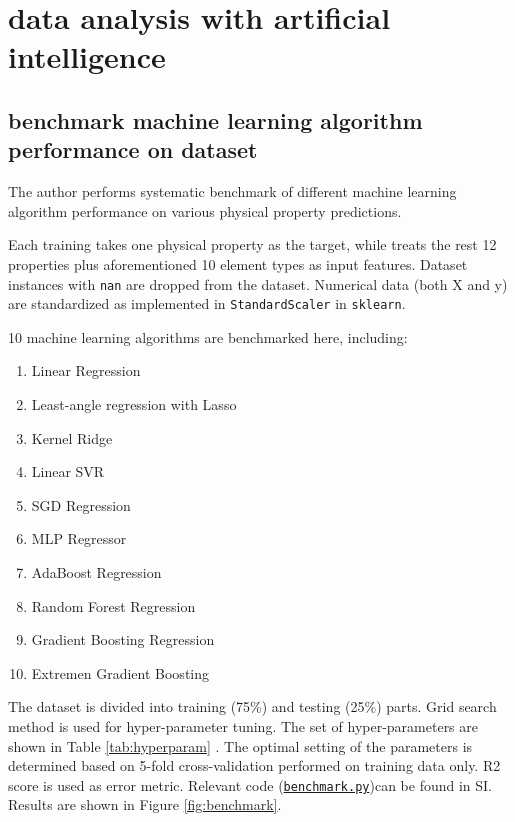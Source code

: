 \documentclass[10pt,aps,prb,amsmath,amssymb,twocolumn,letterpaper,nobalancelastpage,final,citeautoscript,floatfix,raggedbottom,superscriptaddress]{revtex4-1}
\begin{document}
\section{data analysis with artificial intelligence}

\subsection{benchmark machine learning algorithm performance on dataset}

The author performs systematic benchmark of different machine learning algorithm performance on various physical property predictions.

Each training takes one physical property as the target, while treats the rest 12 properties plus aforementioned 10 element types as input features. Dataset instances with \texttt{nan} are dropped from the dataset. Numerical data (both X and y) are standardized as implemented in \texttt{StandardScaler} in \texttt{sklearn}.



10 machine learning algorithms are benchmarked here, including:
\begin{enumerate}
	\item Linear Regression	
	\item Least-angle regression with Lasso
	\item Kernel Ridge
	\item Linear SVR
	\item SGD Regression
	\item MLP Regressor
	\item AdaBoost Regression
	\item Random Forest Regression
	\item Gradient Boosting Regression
	\item Extremen Gradient Boosting
\end{enumerate}


The dataset is divided into training (75\%) and testing (25\%) parts. Grid search method is used for hyper-parameter tuning. The set of hyper-parameters are shown in Table \ref{tab:hyperparam} . The optimal setting of the parameters is determined based on 5-fold cross-validation performed on training data only. R2 score is used as error metric. Relevant code (\hyperlink{ml}{\texttt{benchmark.py}})can be found in SI. Results are shown in Figure \ref{fig:benchmark}.
\end{document}
